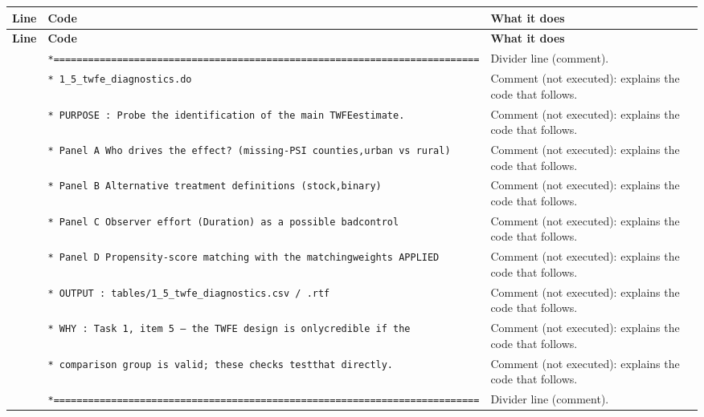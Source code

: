 \documentclass[10pt]{article}
\newcommand{\codetable}[1]{%
{\footnotesize
\begin{longtable}{>{\raggedleft\arraybackslash}p{0.55cm}>{\raggedright\arraybackslash}p{8.3cm}>{\raggedright\arraybackslash}p{8.0cm}}
\toprule \textbf{Line} & \textbf{Code} & \textbf{What it does}\\ \midrule \endfirsthead
\toprule \textbf{Line} & \textbf{Code} & \textbf{What it does}\\ \midrule \endhead
\bottomrule \endfoot
#1
\end{longtable}}}
\begin{document}
\codetable{1 & \texttt{*=========================================================\newline \hspace*{1em}=================} & Divider line (comment).\\
2 & \texttt{* 1\_5\_twfe\_diagnostics.do} & Comment (not executed): explains the code that follows.\\
3 & \texttt{* PURPOSE : Probe the identification of the main TWFE\newline \hspace*{1em}estimate.} & Comment (not executed): explains the code that follows.\\
4 & \texttt{*   Panel A  Who drives the effect? (missing-{}PSI counties,\newline \hspace*{1em}urban vs rural)} & Comment (not executed): explains the code that follows.\\
5 & \texttt{*   Panel B  Alternative treatment definitions (stock,\newline \hspace*{1em}binary)} & Comment (not executed): explains the code that follows.\\
6 & \texttt{*   Panel C  Observer effort (Duration) as a possible \textquotedbl{}bad\newline \hspace*{1em}control\textquotedbl{}} & Comment (not executed): explains the code that follows.\\
7 & \texttt{*   Panel D  Propensity-{}score matching with the matching\newline \hspace*{1em}weights APPLIED} & Comment (not executed): explains the code that follows.\\
8 & \texttt{* OUTPUT  : tables/1\_5\_twfe\_diagnostics.csv / .rtf} & Comment (not executed): explains the code that follows.\\
9 & \texttt{* WHY     : Task 1, item 5 — the TWFE design is only\newline \hspace*{1em}credible if the} & Comment (not executed): explains the code that follows.\\
10 & \texttt{*           comparison group is valid; these checks test\newline \hspace*{1em}that directly.} & Comment (not executed): explains the code that follows.\\
11 & \texttt{*=========================================================\newline \hspace*{1em}=================} & Divider line (comment).\\
}
\end{document}
